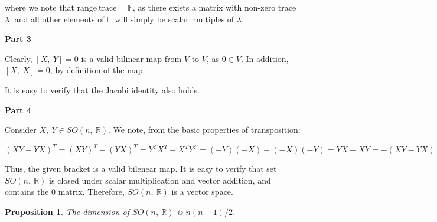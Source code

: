 \documentclass[10pt, oneside]{article}
\newtheorem{prop}{Proposition}
\begin{document}
    where we note that $\text{range} \ \text{trace} = \mathbb{F}$, as there exists a matrix with non-zero trace $\lambda$, and all other elements of $\mathbb{F}$ will
    simply be scalar multiples of $\lambda$.
    \newline

    \textbf{Part 3}
    \newline

    Clearly, $[X, \ Y] = 0$ is a valid bilinear map from $V$ to $V$, as $0 \in V$. In addition, $[X, \ X] = 0$, by definition of the map.
    \newline

    It is easy to verify that the Jacobi identity also holds.
    \newline

    \textbf{Part 4}
    \newline

    Consider $X, \ Y \in SO(n, \ \mathbb{R})$. We note, from the basic properties of transposition:

    $$(XY - YX)^{T} = (XY)^{T} - (YX)^{T} = Y^{T} X^{T} - X^{T} Y^{T} = (-Y)(-X) - (-X)(-Y) = YX - XY = -(XY - YX)$$

    Thus, the given bracket is a valid bilenear map. It is easy to verify that set $SO(n, \ \mathbb{R})$ is closed under
    scalar multiplication and vector addition, and contains the $0$ matrix. Therefore, $SO(n, \ \mathbb{R})$ is a vector space.
    \newline

    \begin{prop}
      The dimension of $SO(n, \ \mathbb{R})$ is $n(n - 1)/2$.
    \end{prop}
\end{document}
